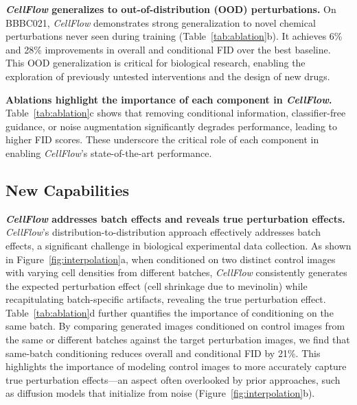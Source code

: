 \textbf{\emph{CellFlow} generalizes to out-of-distribution (OOD) perturbations.}  
On BBBC021, \emph{CellFlow} demonstrates strong generalization to novel chemical perturbations never seen during training (Table~\ref{tab:ablation}b). It achieves 6\% and 28\% improvements in overall and conditional FID over the best baseline. This OOD generalization is critical for biological research, enabling the exploration of previously untested interventions and the design of new drugs.

\textbf{Ablations highlight the importance of each component in \emph{CellFlow}.}  
Table~\ref{tab:ablation}c shows that removing conditional information, classifier-free guidance, or noise augmentation significantly degrades performance, leading to higher FID scores. These underscore the critical role of each component in enabling \emph{CellFlow}’s state-of-the-art performance.  



\subsection{New Capabilities}

\textbf{\emph{CellFlow} addresses batch effects and reveals true perturbation effects.}  
\emph{CellFlow}’s distribution-to-distribution approach effectively addresses batch effects, a significant challenge in biological experimental data collection. As shown in Figure~\ref{fig:interpolation}a, when conditioned on two distinct control images with varying cell densities from different batches, \emph{CellFlow} consistently generates the expected perturbation effect (cell shrinkage due to mevinolin) while recapitulating batch-specific artifacts, revealing the true perturbation effect. Table~\ref{tab:ablation}d further quantifies the importance of conditioning on the same batch. By comparing generated images conditioned on control images from the same or different batches against the target perturbation images, we find that same-batch conditioning reduces overall and conditional FID by 21\%. This highlights the importance of modeling control images to more accurately capture true perturbation effects—an aspect often overlooked by prior approaches, such as diffusion models that initialize from noise (Figure~\ref{fig:interpolation}b).

